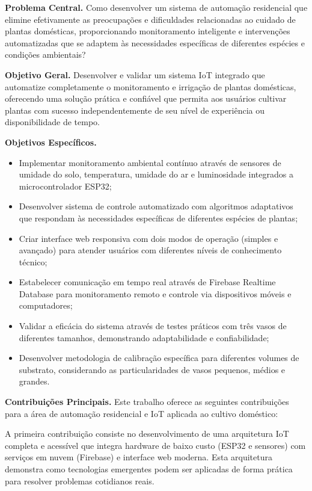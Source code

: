 \documentclass[twoside,english,brazilian]{UNISINOSmonografia}
\begin{document}
\medskip
\noindent\textbf{Problema Central.} Como desenvolver um sistema de automação residencial que elimine efetivamente as preocupações e dificuldades relacionadas ao cuidado de plantas domésticas, proporcionando monitoramento inteligente e intervenções automatizadas que se adaptem às necessidades específicas de diferentes espécies e condições ambientais?

\medskip
\noindent\textbf{Objetivo Geral.} Desenvolver e validar um sistema IoT integrado que automatize completamente o monitoramento e irrigação de plantas domésticas, oferecendo uma solução prática e confiável que permita aos usuários cultivar plantas com sucesso independentemente de seu nível de experiência ou disponibilidade de tempo.

\medskip
\noindent\textbf{Objetivos Específicos.}
\begin{itemize}
    \item Implementar monitoramento ambiental contínuo através de sensores de umidade do solo, temperatura, umidade do ar e luminosidade integrados a microcontrolador ESP32;
    \item Desenvolver sistema de controle automatizado com algoritmos adaptativos que respondam às necessidades específicas de diferentes espécies de plantas;
    \item Criar interface web responsiva com dois modos de operação (simples e avançado) para atender usuários com diferentes níveis de conhecimento técnico;
    \item Estabelecer comunicação em tempo real através de Firebase Realtime Database para monitoramento remoto e controle via dispositivos móveis e computadores;
    \item Validar a eficácia do sistema através de testes práticos com três vasos de diferentes tamanhos, demonstrando adaptabilidade e confiabilidade;
    \item Desenvolver metodologia de calibração específica para diferentes volumes de substrato, considerando as particularidades de vasos pequenos, médios e grandes.
\end{itemize}

\noindent\textbf{Contribuições Principais.} Este trabalho oferece as seguintes contribuições para a área de automação residencial e IoT aplicada ao cultivo doméstico:

A primeira contribuição consiste no desenvolvimento de uma arquitetura IoT completa e acessível que integra hardware de baixo custo (ESP32 e sensores) com serviços em nuvem (Firebase) e interface web moderna. Esta arquitetura demonstra como tecnologias emergentes podem ser aplicadas de forma prática para resolver problemas cotidianos reais.
\end{document}
